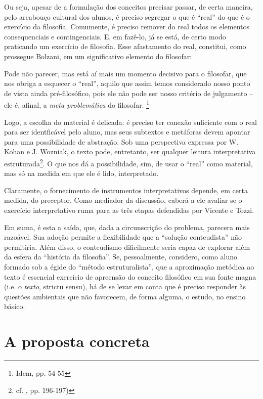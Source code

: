 \documentclass[12pt,a4paper]{article}
\newenvironment{citac}{
	\begin{addmargin}[4cm]{1em} \footnotesize}{\normalfont \end{addmargin}
}
\begin{document}
	Ou seja, apesar de a formulação dos conceitos precisar passar, 
	de certa maneira, pelo arcabouço cultural dos alunos, é preciso 
	segregar o que é “real” do que é o exercício da filosofia. 
	Comumente, é preciso remover do real todos os elementos 
	consequenciais e contingenciais. E, em fazê-lo, já se está, de 
	certo modo praticando um exercício de filosofia. Esse afastamento 
	do real, constitui, como prossegue Bolzani, em um significativo 
	elemento do filosofar: 
	
	\begin{citac}
		Pode não parecer, mas está aí mais um momento decisivo para o 
		filosofar, que nos obriga a esquecer o “real”, aquilo que 
		assim temos considerado nosso ponto de vista ainda 
		pré-filosófico, pois ele não pode ser nosso critério de 
		julgamento -- ele é, afinal, a \emph{meta problemática} do 
		filosofar. \footnote{Idem, pp. 54-55}
	\end{citac}

	Logo, a escolha do material é delicada: é preciso ter conexão 
	suficiente com o real para ser identficável pelo aluno, mas seus 
	subtextos e metáforas devem apontar para uma possibilidade de 
	abstração. Sob uma perspectiva expressa por W. Kohan e J. Wozniak, 
	o texto pode, entretanto, ser qualquer leitura interpretativa 
	estruturada\footnote{cf. \cite{wozkoh}, pp. 196-197)}. O que 
	nos dá a possibilidade, sim, de usar o “real” como material, mas 
	só na medida em que ele é lido, interpretado. 

	Claramente, o fornecimento de instrumentos interpretativos depende, 
	em certa medida, do preceptor. Como mediador da discussão, caberá 
	a ele avaliar se o exercício interpretativo ruma para as três 
	etapas defendidas por Vicente e Tozzi. 

	Em suma, é esta a saída, que, dada a circunscrição do problema, 
	parecera mais razoável. Sua adoção permite a flexibilidade que 
	a “solução conteudista” não permitiria. Além disso, o conteudismo 
	dificilmente seria capaz de explorar além da esfera da “história 
	da filosofia”. Se, pessoalmente, considero, como aluno formado 
	sob a égide do “método estruturalista”, que a aproximação metódica 
	ao texto é essencial exercício de apreensão do conceito filosófico 
	em sua fonte magna (i.e. o \emph{texto}, strictu sensu), há de se 
	levar em conta que é preciso responder às questões ambientais 
	que não favorecem, de forma alguma, o estudo, no ensino básico. 

	\newpage
	
	\section{A proposta concreta}
	
\end{document}
